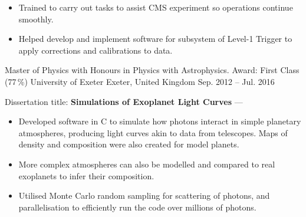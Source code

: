\begin{cventries}
{\begin{cvitems}
            \vpaddingEduSubpoint
            \begin{itemize}
                \item[\bullet]{Trained to carry out tasks to assist CMS experiment so operations continue smoothly.}
                \vpaddingEduSubpoint
                \item[\bullet]{Helped develop and implement software for subsystem of Level-1 Trigger to apply corrections and calibrations to data.}
            \end{itemize}
        \end{cvitems}
        }

    \cventry
        {Master of Physics with Honours in Physics with Astrophysics. Award: First Class (77\,\%)}
        {University of Exeter}
        {Exeter, United Kingdom}
        {Sep. 2012 -- Jul. 2016}
        {
        \begin{cvitems} %
            \item {Dissertation title: \textbf{Simulations of Exoplanet Light Curves} --- }
            \vpaddingEduSubpoint
            \begin{itemize}
                \item[\bullet]{Developed software in C to simulate how photons interact in simple planetary atmospheres, producing light curves akin to data from telescopes. Maps of density and composition were also created for model planets.}
                \vpaddingEduSubpoint
                \item[\bullet]{More complex atmospheres can also be modelled and compared to real exoplanets to infer their composition.}
                \vpaddingEduSubpoint
                \item[\bullet]{Utilised Monte Carlo random sampling for scattering of photons, and parallelisation to efficiently run the code over millions of photons.}
            \end{itemize}
        \end{cvitems}
        } %


\end{cventries}
